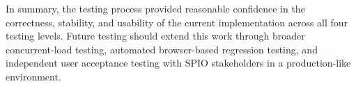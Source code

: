In summary, the testing process provided reasonable confidence in the correctness, stability, and usability of the current implementation across all four testing levels. Future testing should extend this work through broader concurrent-load testing, automated browser-based regression testing, and independent user acceptance testing with SPIO stakeholders in a production-like environment.

